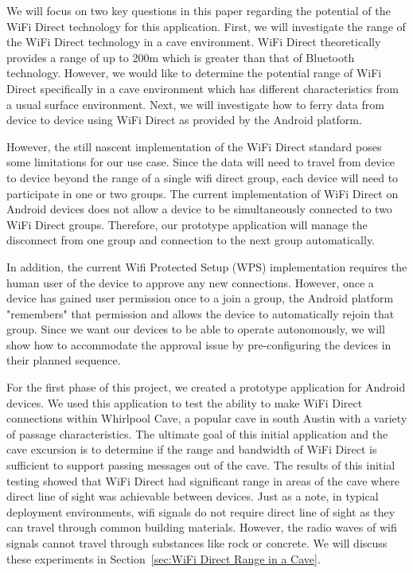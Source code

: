 \documentclass[10pt,twocolumn]{article}
\begin{document}
We will focus on two key questions in this paper regarding the potential of the WiFi Direct technology for this application.
First, we will investigate the range of the WiFi Direct technology in a cave environment.
WiFi Direct theoretically provides a range of up to 200m which is greater than that of Bluetooth technology. 
However, we would like to determine the potential range of WiFi Direct specifically in a cave environment which has different characteristics from a usual surface environment. 
Next, we will investigate how to ferry data from device to device using WiFi Direct as provided by the Android platform. 

However, the still nascent implementation of the WiFi Direct standard poses some limitations for our use case.
Since the data will need to travel from device to device beyond the range of a single wifi direct group, 
each device will need to participate in one or two groups. 
The current implementation of WiFi Direct on Android devices does not allow a device to be simultaneously connected to two WiFi Direct groups.
Therefore, our prototype application will manage the disconnect from one group and connection to the next group automatically.

In addition, the current Wifi Protected Setup (WPS) implementation requires the human user of the device to approve any new connections.
However, once a device has gained user permission once to a join a group, the Android platform "remembers" that permission and allows the device to automatically rejoin that group.
Since we want our devices to be able to operate autonomously, we will show how to accommodate the approval issue by pre-configuring the devices in their planned sequence.
 
For the first phase of this project, we created a prototype application for Android devices. 
We used this application to test the ability to make WiFi Direct connections within Whirlpool Cave, a popular cave in south Austin with a variety of passage characteristics. 
The ultimate goal of this initial application and the cave excursion is to determine if the range and bandwidth of WiFi Direct is sufficient to support passing messages out of the cave.
The results of this initial testing showed that WiFi Direct had significant range in areas of the cave where direct line of sight was achievable between devices.
Just as a note, in typical deployment environments, wifi signals do not require direct line of sight as they can travel through common building materials.
However, the radio waves of wifi signals cannot travel through substances like rock or concrete.
We will discuss these experiments in Section~\ref{sec:WiFi Direct Range in a Cave}.
\end{document}
